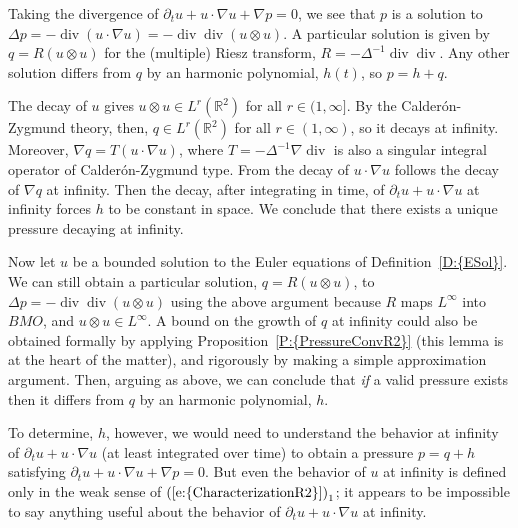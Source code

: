 \documentclass[reqno,openright,11pt,twoside]{amsart}
\theoremstyle{definition}
\numberwithin{equation}{section}
\begin{document}
Taking the divergence of ${\ensuremath{\partial}}_t u + u \cdot {\ensuremath{\nabla}} u + {\ensuremath{\nabla}} p = 0$, we see that $p$ is a solution to $\Delta p = - \operatorname{div}(u \cdot {\ensuremath{\nabla}} u) = - \operatorname{div} \operatorname{div} (u \otimes u)$. A particular solution is given by $q = R (u \otimes u)$ for the (multiple) Riesz transform, $R = - \Delta^{-1} \operatorname{div} \operatorname{div}$. Any other solution differs from $q$ by an harmonic polynomial, $h(t)$, so $p = h + q$.

The decay of $u$ gives $u \otimes u \in L^r({\ensuremath{{\ensuremath{\mathbb{{R}}}}}}^2)$ for all $r \in (1, {\ensuremath{\infty}}]$. By the Calder\'{o}n-Zygmund theory, then, $q \in L^r({\ensuremath{{\ensuremath{\mathbb{{R}}}}}}^2)$ for all $r \in (1, {\ensuremath{\infty}})$, so it decays at infinity. Moreover, ${\ensuremath{\nabla}} q = T (u \cdot {\ensuremath{\nabla}} u)$, where $T = - \Delta^{-1} {\ensuremath{\nabla}} \operatorname{div}$ is also a singular integral operator of Calder\'{o}n-Zygmund type. From the decay of $u \cdot {\ensuremath{\nabla}} u$ follows the decay of ${\ensuremath{\nabla}} q$ at infinity. Then the decay, after integrating in time, of ${\ensuremath{\partial}}_t u + u \cdot {\ensuremath{\nabla}} u$ at infinity forces $h$ to be constant in space. We conclude that there exists a unique pressure decaying at infinity.

Now let $u$ be a bounded solution to the Euler equations of {Definition~\ref{D:{ESol}}}. We can still obtain a particular solution, $q = R (u \otimes u)$, to $\Delta p = - \operatorname{div} \operatorname{div} (u \otimes u)$ using the above argument because $R$ maps $L^{\ensuremath{\infty}}$ into $BMO$, and $u \otimes u \in L^{\ensuremath{\infty}}$. A bound on the growth of $q$ at infinity could also be obtained formally by applying {Proposition~\ref{P:{PressureConvR2}}} (this lemma is at the heart of the matter), and rigorously by making a simple approximation argument. Then, arguing as above, we can conclude that \textit{if} a valid pressure exists then it differs from $q$ by an harmonic polynomial, $h$.

To determine, $h$, however, we would need to understand the behavior at infinity of ${\ensuremath{\partial}}_t u + u \cdot {\ensuremath{\nabla}} u$ (at least integrated over time) to obtain a pressure $p = q + h$ satisfying ${\ensuremath{\partial}}_t u + u \cdot {\ensuremath{\nabla}} u + {\ensuremath{\nabla}} p = 0$. But even the behavior of $u$ at infinity is defined only in the weak sense of ${(\ref{e:{CharacterizationR2}})}_1$; it appears to be impossible to say anything useful about the behavior of ${\ensuremath{\partial}}_t u + u \cdot {\ensuremath{\nabla}} u$ at infinity.
\end{document}
